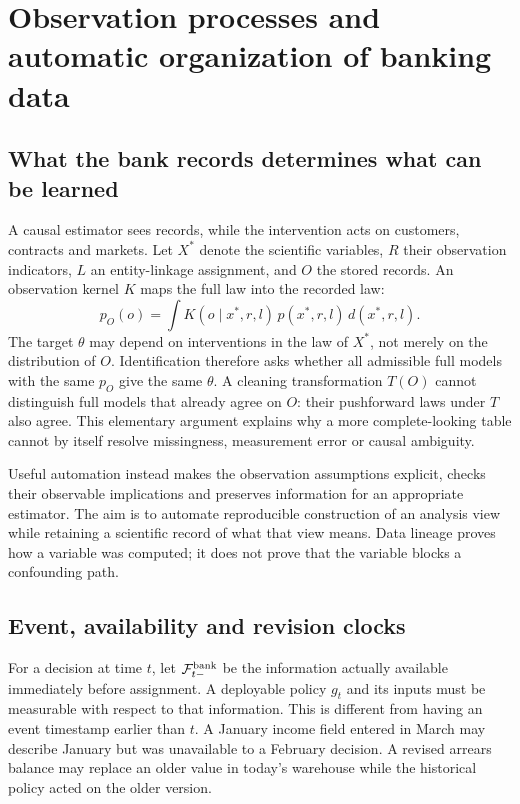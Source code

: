 \chapter{Observation processes and automatic organization of banking data}
\label{r3:observation}
\section{What the bank records determines what can be learned}
A causal estimator sees records, while the intervention acts on customers,
contracts and markets. Let $X^*$ denote the scientific variables, $R$ their
observation indicators, $L$ an entity-linkage assignment, and $O$ the stored
records. An observation kernel $K$ maps the full law into the recorded law:
\begin{equation}
 p_O(o)=\int K(o\mid x^*,r,l)\,p(x^*,r,l)\,d(x^*,r,l).
 \label{r3:observation-kernel}
\end{equation}
The target $\theta$ may depend on interventions in the law of $X^*$,
not merely on the distribution of $O$. Identification therefore asks
whether all admissible full models with the same $p_O$ give the same
$\theta$. A cleaning transformation $T(O)$ cannot distinguish full models
that already agree on $O$: their pushforward laws under $T$ also agree.
This elementary argument explains why a more complete-looking table
cannot by itself resolve missingness, measurement error or causal ambiguity.

Useful automation instead makes the observation assumptions explicit,
checks their observable implications and preserves information for an
appropriate estimator. The aim is to automate reproducible construction
of an analysis view while retaining a scientific record of what that view
means. Data lineage proves how a variable was computed; it does not prove
that the variable blocks a confounding path.

\section{Event, availability and revision clocks}
\label{r3:availability}
For a decision at time $t$, let $\mathcal F^{\rm bank}_{t-}$ be the
information actually available immediately before assignment. A deployable
policy $g_t$ and its inputs must be measurable with respect to that
information. This is different from having an event timestamp earlier
than $t$. A January income field entered in March may describe January
but was unavailable to a February decision. A revised arrears balance
may replace an older value in today's warehouse while the historical
policy acted on the older version.

